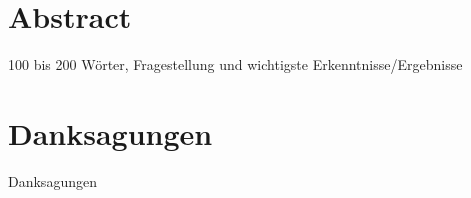 \documentclass[oneside,12pt,a4paper]{report}
\begin{document}
\section*{Abstract}

100 bis 200 Wörter, Fragestellung und wichtigste Erkenntnisse/Ergebnisse
\newpage

\section*{Danksagungen}

Danksagungen

\cleardoublepage


\renewcommand{\baselinestretch}{1.3}
\small\normalsize

\tableofcontents

\renewcommand{\baselinestretch}{1}
\small\normalsize

\cleardoublepage


\setcounter{page}{1}


\cleardoublepage


\cleardoublepage


\cleardoublepage


\cleardoublepage



%
%

\renewcommand{\bibname}{Literaturverzeichnis}
\printbibliography

\end{document}

